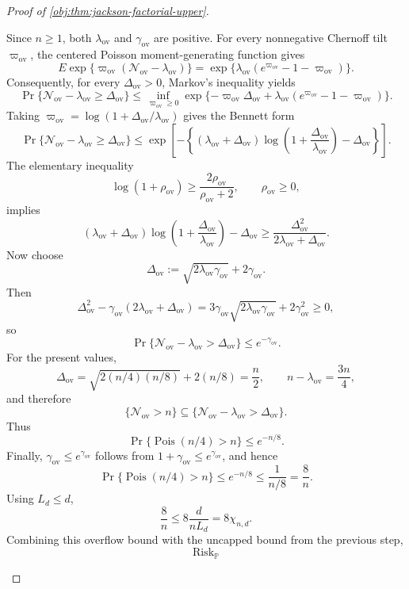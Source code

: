 \documentclass[11pt]{article}
\begin{document}
\begin{proof}[Proof of \cref{obj:thm:jackson-factorial-upper}]
\begin{enumerate}
\[\]
Since \(n\ge1\), both \(\lambda_{\mathrm{ov}}\) and \(\gamma_{\mathrm{ov}}\) are
positive.  For every nonnegative Chernoff tilt \(\varpi_{\mathrm{ov}}\), the
centered Poisson moment-generating function gives
\[
E\exp\{\varpi_{\mathrm{ov}}(\mathcal N_{\mathrm{ov}}-\lambda_{\mathrm{ov}})\}
=
\exp\{\lambda_{\mathrm{ov}}(e^{\varpi_{\mathrm{ov}}}-1-\varpi_{\mathrm{ov}})\}.
\]
Consequently, for every \(\Delta_{\mathrm{ov}}>0\), Markov's inequality yields
\[
\Pr\{\mathcal N_{\mathrm{ov}}-\lambda_{\mathrm{ov}}\ge \Delta_{\mathrm{ov}}\}
\le
\inf_{\varpi_{\mathrm{ov}}\ge0}
\exp\{-\varpi_{\mathrm{ov}}\Delta_{\mathrm{ov}}
+\lambda_{\mathrm{ov}}(e^{\varpi_{\mathrm{ov}}}-1-\varpi_{\mathrm{ov}})\}.
\]
Taking
\(
\varpi_{\mathrm{ov}}
=\log(1+\Delta_{\mathrm{ov}}/\lambda_{\mathrm{ov}})
\)
gives the Bennett form
\[
\Pr\{\mathcal N_{\mathrm{ov}}-\lambda_{\mathrm{ov}}\ge \Delta_{\mathrm{ov}}\}
\le
\exp\left[-\left\{(\lambda_{\mathrm{ov}}+\Delta_{\mathrm{ov}})
\log\left(1+\frac{\Delta_{\mathrm{ov}}}{\lambda_{\mathrm{ov}}}\right)
-\Delta_{\mathrm{ov}}\right\}\right].
\]
The elementary inequality
\[
\log(1+\rho_{\mathrm{ov}})\ge \frac{2\rho_{\mathrm{ov}}}{\rho_{\mathrm{ov}}+2},
\qquad \rho_{\mathrm{ov}}\ge0,
\]
implies
\[
(\lambda_{\mathrm{ov}}+\Delta_{\mathrm{ov}})
\log\left(1+\frac{\Delta_{\mathrm{ov}}}{\lambda_{\mathrm{ov}}}\right)
-\Delta_{\mathrm{ov}}
\ge
\frac{\Delta_{\mathrm{ov}}^2}{2\lambda_{\mathrm{ov}}+\Delta_{\mathrm{ov}}}.
\]
Now choose
\[
\Delta_{\mathrm{ov}}
:=
\sqrt{2\lambda_{\mathrm{ov}}\gamma_{\mathrm{ov}}}+2\gamma_{\mathrm{ov}}.
\]
Then
\[
\Delta_{\mathrm{ov}}^2
-\gamma_{\mathrm{ov}}(2\lambda_{\mathrm{ov}}+\Delta_{\mathrm{ov}})
=
3\gamma_{\mathrm{ov}}\sqrt{2\lambda_{\mathrm{ov}}\gamma_{\mathrm{ov}}}
+2\gamma_{\mathrm{ov}}^2
\ge0,
\]
so
\[
\Pr\{\mathcal N_{\mathrm{ov}}-\lambda_{\mathrm{ov}}>\Delta_{\mathrm{ov}}\}
\le e^{-\gamma_{\mathrm{ov}}}.
\]
For the present values,
\[
\Delta_{\mathrm{ov}}
=\sqrt{2(n/4)(n/8)}+2(n/8)
=\frac n2,
\qquad
n-\lambda_{\mathrm{ov}}=\frac{3n}{4},
\]
and therefore
\[
\{\mathcal N_{\mathrm{ov}}>n\}
\subseteq
\{\mathcal N_{\mathrm{ov}}-\lambda_{\mathrm{ov}}>\Delta_{\mathrm{ov}}\}.
\]
Thus
\[
\Pr\{\operatorname{Pois}(n/4)>n\}
\le e^{-n/8}.
\]
Finally, \(\gamma_{\mathrm{ov}}\le e^{\gamma_{\mathrm{ov}}}\) follows from
\(1+\gamma_{\mathrm{ov}}\le e^{\gamma_{\mathrm{ov}}}\), and hence
\[
\Pr\{\operatorname{Pois}(n/4)>n\}
\le e^{-n/8}
\le \frac{1}{n/8}
=
\frac8n .
\]
Using \(L_d\le d\),
\[
\frac8n\le 8\frac{d}{nL_d}=8\chi_{n,d}.
\]
Combining this overflow bound with the uncapped bound from the previous step,
\[
\operatorname{Risk}_{\mathbb P}
\]
\end{enumerate}
\end{proof}
\end{document}

